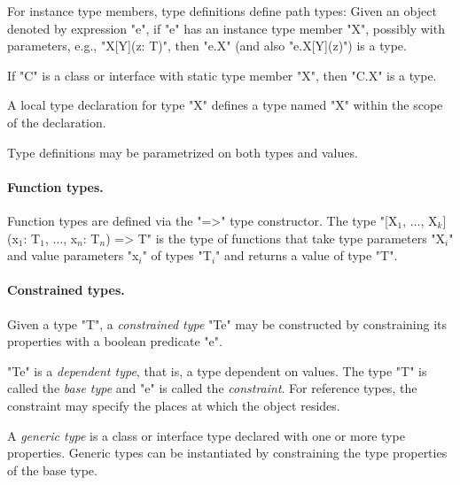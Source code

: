 
        For instance type members, type definitions define path
        types: Given an object
        denoted by expression \xcd"e", if \xcd"e" has an
        instance
        type member \xcd"X", possibly with parameters, e.g.,
        \xcd"X[Y](z: T)", then \xcd"e.X" (and also \xcd"e.X[Y](z)")
        is a type.

        If \xcd"C" is a class or interface with static type
        member \xcd"X", then \xcd"C.X" is a type.

        A local type declaration for type \xcd"X" defines a type
        named \xcd"X" within the scope of the declaration.

        Type definitions may be parametrized on both types and
        values.

\paragraph{Function types.}

        Function types are defined via the \xcd"=>" type
        constructor.  The type
  \xcdmath"[X$_1$, $\dots$, X$_k$](x$_1$: T$_1$, $\dots$, x$_n$: T$_n$) => T"
        is the type of functions that take type parameters
        \xcdmath"X$_i$"
        and value parameters
        \xcdmath"x$_i$"
        of types
        \xcdmath"T$_i$"
        and returns a value of type \xcd"T".

\paragraph{Constrained types.}
        Given a type \xcd"T", a {\em constrained type}
        \xcd"T{e}" may be
        constructed by constraining its properties with a
        boolean predicate \xcd"e".

        \xcd"T{e}" is a {\em dependent type}, that is, a type
        dependent on values.
        The type \xcd"T" is called the
        {\em base type} and \xcd"e" is called the {\em constraint}.
        For reference types, the constraint may
        specify the places at which the object resides.

        A {\em generic type} is a class or interface type
        declared with one or more type properties.  Generic
        types can be instantiated by constraining the type
        properties of the base type.



